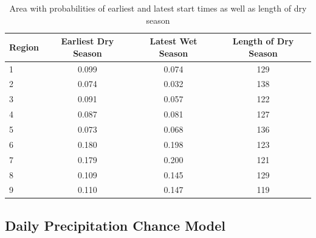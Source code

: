 \documentclass{article}
\begin{document}
\begin{table}[h!]
\begin{tabular}{|l|c|c|c|}
\hline
Region & Earliest Dry Season & Latest Wet Season & Length of Dry Season\\
\hline
\hline
1&0.099&0.074&129 \\
2&0.074&0.032&138 \\
3&0.091&0.057&122 \\
4&0.087&0.081&127\\
5&0.073&0.068&136 \\
6&0.180&0.198&123\\
7&0.179&0.200&121\\
8&0.109&0.145&129\\
9&0.110&0.147&119\\
\hline
\end{tabular}
\caption{Area with probabilities of earliest and latest start times as well as length of dry season }
\label{lengthProb}
\end{table}


\subsection{Daily Precipitation Chance Model}
\end{document}
